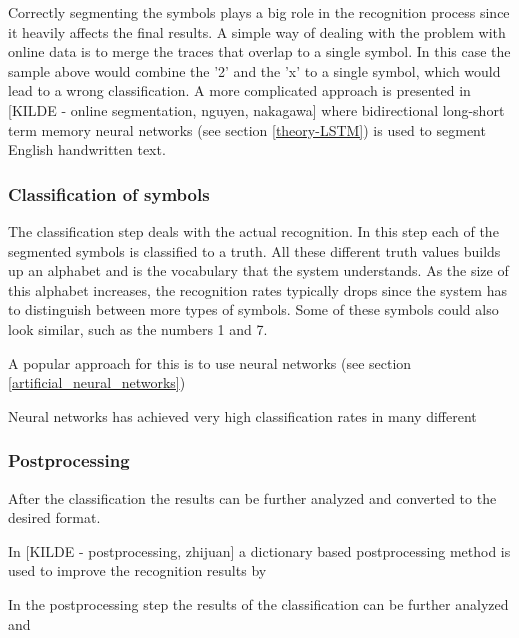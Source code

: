 Correctly segmenting the symbols plays a big role in the recognition process since it heavily affects the final results. A simple way of dealing with the problem with online data is to merge the traces that overlap to a single symbol. In this case the sample above would combine the '2' and the 'x' to a single symbol, which would lead to a wrong classification. A more complicated approach is presented in [KILDE - online segmentation, nguyen, nakagawa] where bidirectional long-short term memory neural networks (see section \ref{theory-LSTM}) is used to segment English handwritten text.

\subsubsection{Classification of symbols}
The classification step deals with the actual recognition. In this step each of the segmented symbols is classified to a truth. All these different truth values builds up an alphabet and is the vocabulary that the system understands. As the size of this alphabet increases, the recognition rates typically drops since the system has to distinguish between more types of symbols. Some of these symbols could also look similar, such as the numbers 1 and 7. 

A popular approach for this is to use neural networks (see section \ref{artificial_neural_networks})

Neural networks has achieved very high classification rates in many different 

\subsubsection{Postprocessing}

After the classification the results can be further analyzed and converted to the desired format. 

In [KILDE - postprocessing, zhijuan] a dictionary based postprocessing method is used to improve the recognition results by 

In the postprocessing step the results of the classification can be further analyzed and 




